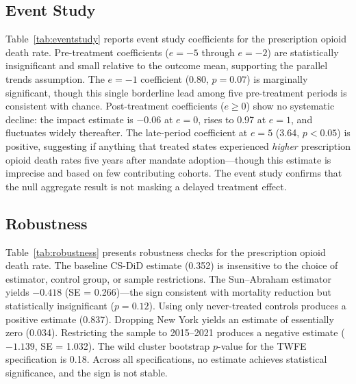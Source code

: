 \documentclass[12pt]{article}
\begin{document}
\subsection{Event Study}



Table~\ref{tab:eventstudy} reports event study coefficients for the prescription opioid death rate. Pre-treatment coefficients ($e = -5$ through $e = -2$) are statistically insignificant and small relative to the outcome mean, supporting the parallel trends assumption. The $e = -1$ coefficient (0.80, $p = 0.07$) is marginally significant, though this single borderline lead among five pre-treatment periods is consistent with chance. Post-treatment coefficients ($e \geq 0$) show no systematic decline: the impact estimate is $-0.06$ at $e = 0$, rises to 0.97 at $e = 1$, and fluctuates widely thereafter. The late-period coefficient at $e = 5$ (3.64, $p < 0.05$) is positive, suggesting if anything that treated states experienced \textit{higher} prescription opioid death rates five years after mandate adoption---though this estimate is imprecise and based on few contributing cohorts. The event study confirms that the null aggregate result is not masking a delayed treatment effect.

\subsection{Robustness}



Table~\ref{tab:robustness} presents robustness checks for the prescription opioid death rate. The baseline CS-DiD estimate (0.352) is insensitive to the choice of estimator, control group, or sample restrictions. The Sun--Abraham estimator yields $-0.418$ (SE = 0.266)---the sign consistent with mortality reduction but statistically insignificant ($p = 0.12$). Using only never-treated controls produces a positive estimate (0.837). Dropping New York yields an estimate of essentially zero (0.034). Restricting the sample to 2015--2021 produces a negative estimate ($-1.139$, SE = 1.032). The wild cluster bootstrap $p$-value for the TWFE specification is 0.18. Across all specifications, no estimate achieves statistical significance, and the sign is not stable.
\end{document}
